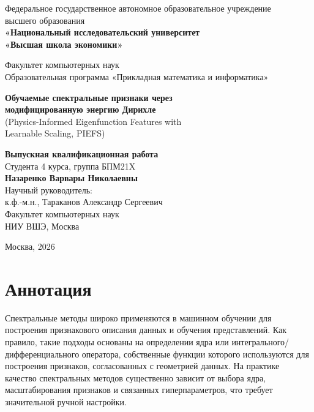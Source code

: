 \documentclass[14pt, a4paper, oneside]{extreport}
\theoremstyle{plain}
\theoremstyle{definition}
\begin{document}
\begin{titlepage}
\begin{center}
{\large Федеральное государственное автономное образовательное учреждение\\
высшего образования\\
\textbf{«Национальный исследовательский университет\\
«Высшая школа экономики»}}

\vspace{0.5cm}
{\large Факультет компьютерных наук}\\
{\large Образовательная программа «Прикладная математика и информатика»}

\vfill

{\LARGE\bfseries Обучаемые спектральные признаки через\\
модифицированную энергию Дирихле\\[0.3cm]}
{\large (Physics-Informed Eigenfunction Features with\\
Learnable Scaling, PIEFS)}

\vfill

\begin{flushright}
{\large\textbf{Выпускная квалификационная работа}}\\[0.5cm]
Студента 4 курса, группа БПМ21X\\[0.3cm]
\textbf{Назаренко Варвары Николаевны}\\[1cm]
Научный руководитель:\\
к.ф.-м.н., Тараканов Александр Сергеевич\\
Факультет компьютерных наук\\
НИУ ВШЭ, Москва
\end{flushright}

\vfill
{\large Москва, 2026}
\end{center}
\end{titlepage}

\chapter*{Аннотация}

Спектральные методы широко применяются в машинном обучении для построения признакового описания данных и обучения представлений.
Как правило, такие подходы основаны на определении ядра или интегрального/дифференциального оператора, собственные функции которого используются для построения признаков, согласованных с геометрией данных.
На практике качество спектральных методов существенно зависит от выбора ядра, масштабирования признаков и связанных гиперпараметров, что требует значительной ручной настройки.
\end{document}
